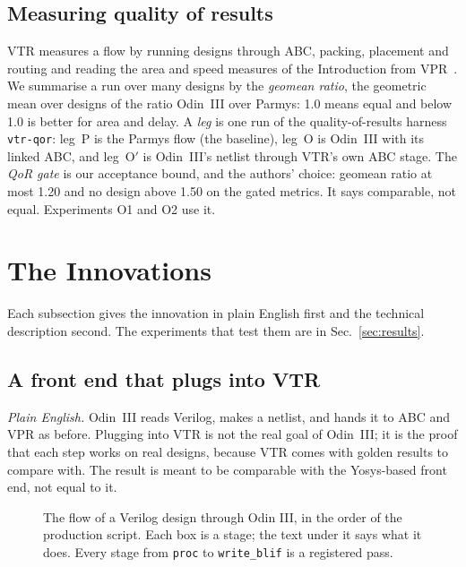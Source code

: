 \documentclass[conference]{IEEEtran}
\newcommand{\code}[1]{\texttt{#1}}
\begin{document}
\subsection{Measuring quality of results}

VTR measures a flow by running designs through ABC, packing, placement and routing and reading the area and speed measures of the Introduction from VPR~\cite{rose2012vtr,luu2014vtr7,murray2020vtr8}. We summarise a run over many designs by the \emph{geomean ratio}, the geometric mean over designs of the ratio Odin~III over Parmys: 1.0 means equal and below 1.0 is better for area and delay. %
A \emph{leg} is one run of the quality-of-results harness \code{vtr-qor}: leg~P is the Parmys flow (the baseline), leg~O is Odin~III with its linked ABC, and leg~O$'$ is Odin~III's netlist through VTR's own ABC stage. %
The \emph{QoR gate} is our acceptance bound, and the authors' choice: geomean ratio at most 1.20 and no design above 1.50 on the gated metrics. It says comparable, not equal. %
Experiments O1 and O2 use it.

\section{The Innovations}
\label{sec:arch}

Each subsection gives the innovation in plain English first and the technical description second. The experiments that test them are in Sec.~\ref{sec:results}.

\subsection{A front end that plugs into VTR}
\label{sec:vtr-link}

\emph{Plain English.} Odin~III reads Verilog, makes a netlist, and hands it to ABC and VPR as before. Plugging into VTR is not the real goal of Odin~III; it is the proof that each step works on real designs, because VTR comes with golden results to compare with. The result is meant to be comparable with the Yosys-based front end, not equal to it.

\begin{figure}[t]
\centering
\odinfit{\textwidth}{}
\caption{The flow of a Verilog design through Odin III, in the order of the production script. Each box is a stage; the text under it says what it does. Every stage from \code{proc} to \code{write\_blif} is a registered pass.}
\label{fig:flow}
\end{figure}
\end{document}
